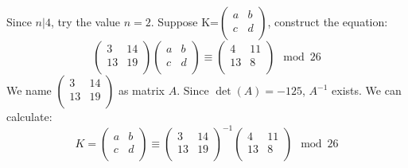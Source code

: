 \documentclass[a4paper]{article}
\begin{document}
\begin{enumerate}
Since $n|4$, try the value $n=2$. Suppose K=$
    \left(
    \begin{array}{ccc}
    a & b\\
    c & d\\
    \end{array}
    \right)$, construct the equation:
	$$
    \left(
    \begin{array}{ccc}
    3 & 14\\
    13 & 19\\
    \end{array}
    \right)
    \left(
    \begin{array}{ccc}
    a & b\\
    c & d\\
    \end{array}
    \right)
    \equiv
    \left(
    \begin{array}{ccc}
    4 & 11\\
    13 & 8\\
    \end{array}
    \right)
    \mod
    26
    $$
We name $
    \left(
    \begin{array}{ccc}
    3 & 14\\
    13 & 19\\
    \end{array}
    \right)$ as matrix $A$. Since $\det(A)=-125$, $A^{-1}$ exists. We can calculate:
    $$K=
    \left(
    \begin{array}{ccc}
    a & b\\
    c & d\\
    \end{array}
    \right)
    \equiv
    \left(
    \begin{array}{ccc}
    3 & 14\\
    13 & 19\\
    \end{array}
    \right)^{-1}
    \left(
    \begin{array}{ccc}
    4 & 11\\
    13 & 8\\
    \end{array}
    \right)
    \mod
    26
    $$
    

\end{enumerate}
\end{document}
